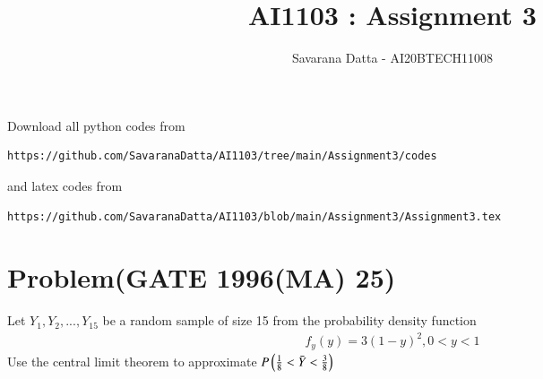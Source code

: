 \documentclass[journal,12pt,twocolumn]{IEEEtran}
\begin{document}
     \def\rightbox#1{\makebox[0in][r]{#1}}
     \def\centbox#1{\makebox[0in]{#1}}
     \def\topbox#1{\raisebox{-\baselineskip}[0in][0in]{#1}}
     \def\midbox#1{\raisebox{-0.5\baselineskip}[0in][0in]{#1}}
\vspace{3cm}
\title{AI1103 : Assignment 3}
\author{Savarana Datta - AI20BTECH11008}
\maketitle
\newpage
\bigskip
\renewcommand{\thefigure}{\theenumi}
\renewcommand{\thetable}{\theenumi}
Download all python codes from 
\begin{lstlisting}
https://github.com/SavaranaDatta/AI1103/tree/main/Assignment3/codes
\end{lstlisting}
%
and latex codes from 
%
\begin{lstlisting}
https://github.com/SavaranaDatta/AI1103/blob/main/Assignment3/Assignment3.tex
\end{lstlisting}


\section*{Problem(GATE 1996(MA) 25)}
Let $Y_{1},Y_{2},...,Y_{15}$ be a random sample of size 15 from the probability density function 
\begin{align}
\tag{Eq:1}
    f_{y}(y)=3(1-y)^{2} , 0<y<1
\end{align}
Use the central limit theorem to approximate $P\left(\frac{1}{8}<\Bar{Y}<\frac{3}{8}\right)$
\end{document}
